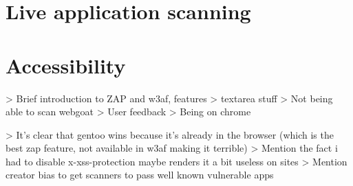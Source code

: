 \section{Live application scanning}


\section{Accessibility}

> Brief introduction to ZAP and w3af, features
> textarea stuff	
> Not being able to scan webgoat
> User feedback
> Being on chrome

> It's clear that gentoo wins because it's already in the browser (which is the best zap feature, not available in w3af making it terrible) 
> Mention the fact i had to disable x-xss-protection maybe renders it a bit useless on sites
> Mention creator bias to get scanners to pass well known vulnerable apps



































